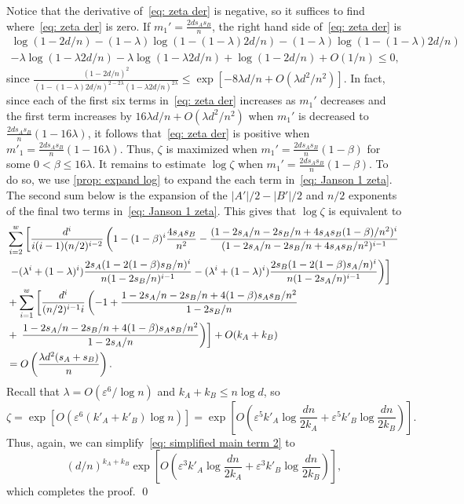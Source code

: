 \documentclass[11pt]{article}
\newcommand{\eps}{\varepsilon}
\theoremstyle{plain}
\begin{document}
Notice that the derivative of~\eqref{eq: zeta der} is negative, so it suffices to find where~\eqref{eq: zeta der} is zero.
If $m_1'= \frac{2ds_As_B}{n}$, the right hand side of~\eqref{eq: zeta der} is 
\begin{align*}
    \log(1 - 2d/n) - (1 - \lambda )\log(1 - (1-\lambda )2d/n) - (1 - \lambda )\log(1 - (1 - \lambda )2d/n )\\
    -\lambda \log(1 - \lambda 2d/n) - \lambda \log(1 - \lambda 2d/n) + \log\left(1 - 2d/n\right) + O(1/n)
    \leq 0,
\end{align*}
since $\frac{(1 - 2d/n)^2}{(1 - (1 - \lambda )2d/n)^{2 - 2\lambda }(1 - \lambda 2d/n)^{2\lambda }} \leq \exp[-8\lambda d/n + O(\lambda d^2/n^2)]$. In fact, since each of the first six terms in~\eqref{eq: zeta der} increases as $m_1'$ decreases and the first term increases by $16\lambda d/n + O(\lambda d^2/n^2)$ when $m_1'$ is decreased to $\frac{2ds_As_B}{n}(1 - 16\lambda )$, it follows that~\eqref{eq: zeta der} is positive when $m'_1 = \frac{2ds_As_B}{n}(1 - 16\lambda )$. Thus, $\zeta$ is maximized when $m_1' = \frac{2ds_As_B}{n}(1 - \beta)$ for some $0 < \beta \leq 16\lambda $. 
It remains to estimate $\log\zeta$ when $m_1' = \frac{2ds_As_B}{n}(1 - \beta)$. To do so, we use \cref{prop: expand log} to expand the each term in~\eqref{eq: Janson 1 zeta}. The second sum below is the expansion of the $|A'|/2 - |B'|/2$ and $n/2$ exponents of the final two terms in~\eqref{eq: Janson 1 zeta}. This gives that $\log \zeta$ is equivalent to 
\begin{align}
    &\sum_{i = 2}^w\left[\frac{d^i}{i(i-1)(n/2)^{i-2}}\left(1 - (1 - \beta)^i\frac{4s_As_B}{n^2} - \frac{(1 - 2s_A/n - 2s_B / n + 4s_As_B(1 - \beta)/n^2)^i}{(1 - 2s_A/n - 2s_B/n + 4s_As_B/n^2)^{i-1}}  \right. \right.\notag\\&\left.\left. -(\lambda ^i + (1 - \lambda )^i)\frac{2s_A(1-2(1 - \beta)s_B/n)^i}{n(1 - 2s_B/n)^{i-1}} - (\lambda ^i + (1 - \lambda )^i)\frac{2s_B(1-2(1 - \beta)s_A/n)^i}{n(1 - 2s_A/n)^{i-1}}\right)\right] \notag\\
    &+ \sum_{i = 1}^{w}\left[\frac{d^i}{(n/2)^{i-1}i}\left(-1 + \frac{1 - 2s_A/n - 2s_B/n + 4(1 - \beta)s_As_B/n^2}{1 - 2s_B/n}\right.\right.\notag\\&+ \left.\left.\frac{1 - 2s_A/n - 2s_B/n + 4(1 - \beta)s_As_B/n^2}{1 - 2s_A/n}\right)\right] + O(k_A + k_B)\notag\\
    &= O\left(\frac{\lambda d^2(s_A + s_B)}{n}\right).\notag
\end{align}
Recall that $\lambda  = O(\eps^6 / \log n)$ and $k_A + k_B \leq n\log d$, so \[
\zeta = \exp\left[O\left(\eps^6(k'_A + k'_B)\log n\right)\right] = \exp\left[O\left(\eps^5k'_A\log\frac{dn}{2k_A} + \eps^5k'_B\log\frac{dn}{2k_B}\right)\right].
\]
Thus, again, we can simplify~\eqref{eq: simplified main term 2} to 
\[
(d/n)^{k_A + k_B}\exp\left[O\left(\eps^3k'_A\log\frac{dn}{2k_A} + \eps^3k'_B\log\frac{dn}{2k_B}\right)\right],
\]
which completes the proof.
\qed
\end{document}
